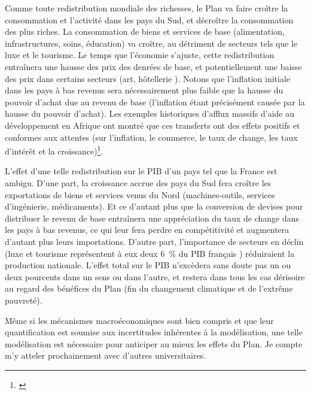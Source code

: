 \documentclass[a5paper,french,openany]{memoir}
\begin{document}
Comme toute redistribution mondiale des richesses, le Plan va faire croître la consommation et l'activité dans les pays du Sud, et décroître la consommation des plus riches. La consommation de biens et services de base (alimentation, infrastructures, soins, éducation) va croître, au détriment de secteurs tels que le luxe et le tourisme. Le temps que l'économie s'ajuste, cette redistribution entraînera une hausse des prix des denrées de base, et potentiellement une baisse des prix dans certains secteurs (art, hôtellerie%
). 
Notons que l'inflation initiale dans les pays à bas revenus sera nécessairement plus faible que la hausse du pouvoir d'achat due au revenu de base (l'inflation étant précisément causée par la hausse du pouvoir d'achat). Les exemples historiques d'afflux massifs d'aide au développement en Afrique ont montré que ces transferts ont des effets positifs et conformes aux attentes (sur l'inflation, le commerce, le taux de change, les taux d'intérêt et la croissance)\footnote{\cite{strand_revenue_2009,berg_macroeconomics_2007}}.

L'effet d'une telle redistribution sur le PIB d'un pays tel que la France est ambigu. D'une part, la croissance accrue des pays du Sud fera croître les exportations de biens et services venus du Nord (machines-outils, services d'ingénierie, médicaments). Et ce d'autant plus que la conversion de devises pour distribuer le revenu de base entraînera une appréciation du taux de change dans les pays à bas revenus, ce qui leur fera perdre en compétitivité et augmentera d'autant plus leurs importations. D'autre part, l'importance de secteurs en déclin (luxe et tourisme représentent à eux deux 6~\% du PIB français%
) réduiraient la production nationale. L'effet total sur le PIB n'excèdera sans doute pas un ou deux pourcents dans un sens ou dans l'autre, et restera dans tous les cas dérisoire au regard des bénéfices du Plan (fin du changement climatique et de l'extrême pauvreté). 

Même si les mécanismes macroéconomiques sont bien compris et que leur quantification est soumise aux incertitudes inhérentes à la modélisation, une telle modélisation est nécessaire pour anticiper au mieux les effets du Plan. Je compte m'y atteler prochainement avec d'autres universitaires.
\end{document}
